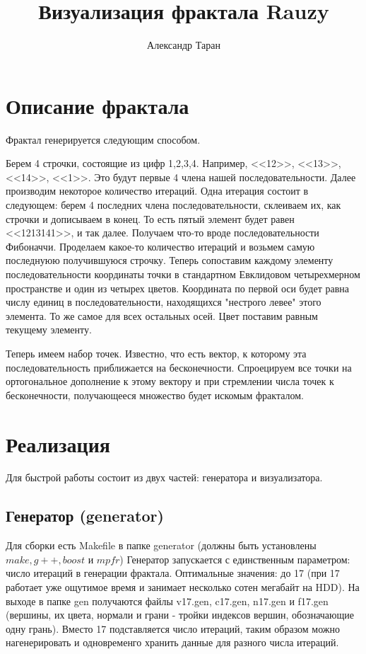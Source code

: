 \documentclass{article}
\title{Визуализация фрактала Rauzy}
\author{Александр Таран}
\begin{document}
\maketitle

\section{Описание фрактала}

Фрактал генерируется следующим способом.

Берем 4 строчки, состоящие из цифр 1,2,3,4. Например, <<12>>, <<13>>, <<14>>, <<1>>. Это будут первые 4 члена нашей последовательности. Далее производим некоторое количество итераций. Одна итерация состоит в следующем: берем 4 последних члена последовательности, склеиваем их, как строчки и дописываем в конец. То есть пятый элемент будет равен <<1213141>>, и так далее. Получаем что-то вроде последовательности Фибоначчи. Проделаем какое-то количество итераций и возьмем самую последнуюю получившуюся строчку. Теперь сопоставим каждому элементу последовательности координаты точки в стандартном Евклидовом четырехмерном пространстве и один из четырех цветов. Координата по первой оси будет равна числу единиц в последовательности, находящихся "нестрого левее" этого элемента. То же самое для всех остальных осей. Цвет поставим равным текущему элементу.

Теперь имеем набор точек. Известно, что есть вектор, к которому эта последовательность приближается на бесконечности. Спроецируем все точки на ортогональное дополнение к этому вектору и при стремлении числа точек к бесконечности, получающееся множество будет искомым фракталом.

\section{Реализация}
Для быстрой работы состоит из двух частей: генератора и визуализатора.
\subsection{Генератор (generator)}
Для сборки есть Makefile в папке generator (должны быть установлены $make, g++, boost$ и $mpfr$)
Генератор запускается с единственным параметром: число итераций в генерации фрактала.
Оптимальные значения: до 17 (при 17 работает уже ощутимое время и занимает несколько сотен мегабайт на HDD).
На выходе в папке gen получаются файлы v17.gen, c17.gen, n17.gen и f17.gen (вершины, их цвета, нормали и грани - тройки индексов вершин, обозначающие одну грань).
Вместо 17 подставляется число итераций, таким образом можно нагенерировать и одновременго хранить данные для разного числа итераций.
\end{document}
